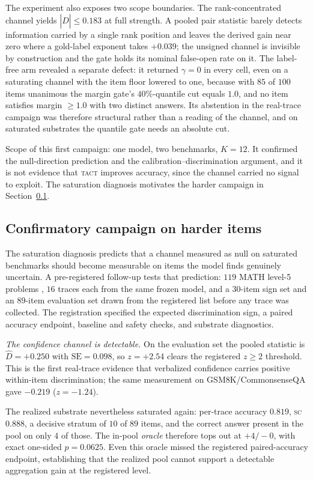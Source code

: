 \documentclass[conference]{IEEEtran}
\newcommand{\Dhat}{\widehat{D}}
\newcommand{\SC}{\textsc{sc}}
\newcommand{\TACT}{\textsc{tact}}
\begin{document}
The experiment also exposes two scope boundaries. The
rank-concentrated channel yields $|\Dhat|\le0.183$ at full strength. A pooled
pair statistic barely detects information carried by a single rank position and
leaves the derived gain near zero where a gold-label exponent takes $+0.039$;
the unsigned channel is invisible by construction and the gate holds its
nominal false-open rate on it. The label-free arm revealed a separate defect: it
returned $\gamma=0$ in every cell, even on a saturating channel with the item floor
lowered to one, because with $85$ of $100$ items unanimous the margin gate's
$40\%$-quantile cut equals $1.0$, and no item satisfies margin $\ge 1.0$ with
two distinct answers. Its abstention in the real-trace campaign was therefore structural rather
than a reading of the channel, and on saturated substrates the quantile gate
needs an absolute cut.

Scope of this first campaign: one model, two benchmarks, $K{=}12$. It confirmed
the null-direction prediction and the calibration--discrimination argument, and
it is not evidence that \TACT{} improves accuracy, since the channel carried no
signal to exploit. The saturation diagnosis motivates the harder campaign in
Section~\ref{sec:hard}.

\subsection{Confirmatory campaign on harder items}\label{sec:hard}
The saturation diagnosis predicts that a channel measured as null on saturated benchmarks
should become measurable on items the model finds genuinely uncertain. A
pre-registered follow-up tests that prediction: $119$ MATH level-5 problems
\cite{math500,lightman2024verify}, $16$ traces each from the same frozen
model, and a $30$-item sign set and an $89$-item evaluation set drawn from the
registered list before any trace was collected. The registration specified the
expected discrimination sign, a paired accuracy endpoint, baseline and safety
checks, and substrate diagnostics.

\emph{The confidence channel is detectable.} On the evaluation set the pooled statistic is
$\Dhat=+0.250$ with $\mathrm{SE}=0.098$, so $z=+2.54$ clears the registered
$z\ge2$ threshold. This is
the first real-trace evidence that verbalized confidence carries positive
within-item discrimination; the same measurement on GSM8K/CommonsenseQA gave
$-0.219$ ($z=-1.24$).

The realized substrate nevertheless saturated again: per-trace accuracy
$0.819$, \SC{} $0.888$, a decisive
stratum of $10$ of $89$ items, and the correct answer present in the pool on
only $4$ of those. The in-pool \emph{oracle} therefore tops out at $+4/-0$,
with exact one-sided $p=0.0625$. Even this oracle missed the registered
paired-accuracy endpoint, establishing that the realized pool cannot support a
detectable aggregation gain at the registered level.
\end{document}
